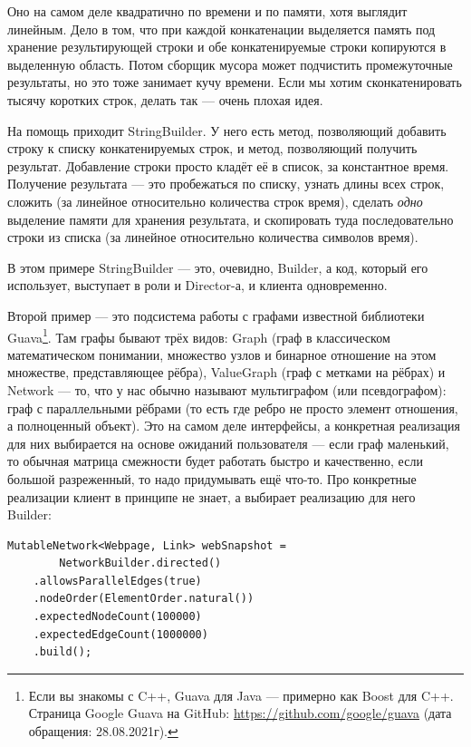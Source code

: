 \documentclass{../../text-style}
\begin{document}
Оно на самом деле квадратично по времени и по памяти, хотя выглядит линейным. Дело в том, что при каждой конкатенации выделяется память под хранение результирующей строки и обе конкатенируемые строки копируются в выделенную область. Потом сборщик мусора может подчистить промежуточные результаты, но это тоже занимает кучу времени. Если мы хотим сконкатенировать тысячу коротких строк, делать так --- очень плохая идея.

На помощь приходит StringBuilder. У него есть метод, позволяющий добавить строку к списку конкатенируемых строк, и метод, позволяющий получить результат. Добавление строки просто кладёт её в список, за константное время. Получение результата --- это пробежаться по списку, узнать длины всех строк, сложить (за линейное относительно количества строк время), сделать \emph{одно} выделение памяти для хранения результата, и скопировать туда последовательно строки из списка (за линейное относительно количества символов время).

В этом примере StringBuilder --- это, очевидно, Builder, а код, который его использует, выступает в роли и Director-а, и клиента одновременно.

Второй пример --- это подсистема работы с графами известной библиотеки Guava\footnote{Если вы знакомы с C++, Guava для Java --- примерно как Boost для C++. Страница Google Guava на GitHub: \url{https://github.com/google/guava} (дата обращения: 28.08.2021г).}. Там графы бывают трёх видов: Graph (граф в классическом математическом понимании, множество узлов и бинарное отношение на этом множестве, представляющее рёбра), ValueGraph (граф с метками на рёбрах) и Network --- то, что у нас обычно называют мультиграфом (или псевдографом): граф с параллельными рёбрами (то есть где ребро не просто элемент отношения, а полноценный объект). Это на самом деле интерфейсы, а конкретная реализация для них выбирается на основе ожиданий пользователя --- если граф маленький, то обычная матрица смежности будет работать быстро и качественно, если большой разреженный, то надо придумывать ещё что-то. Про конкретные реализации клиент в принципе не знает, а выбирает реализацию для него Builder:

\begin{verbatim}
MutableNetwork<Webpage, Link> webSnapshot = 
        NetworkBuilder.directed()
    .allowsParallelEdges(true)
    .nodeOrder(ElementOrder.natural())
    .expectedNodeCount(100000)
    .expectedEdgeCount(1000000)
    .build();
\end{verbatim}
\end{document}
